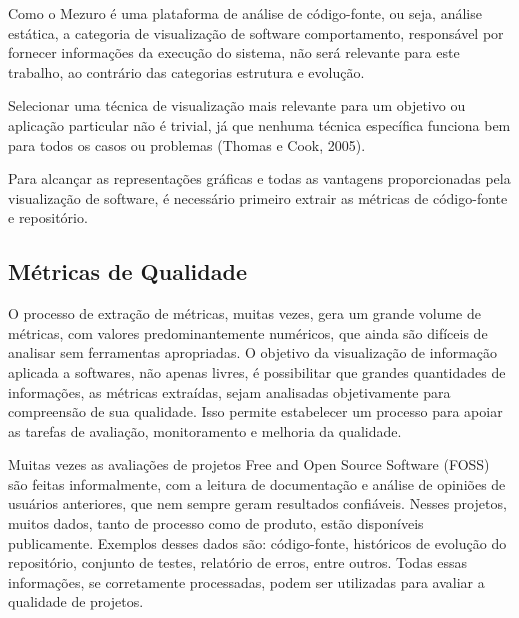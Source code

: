 Como o Mezuro é uma plataforma de análise de código-fonte, ou seja, análise estática, a categoria de visualização de software comportamento, responsável por fornecer informações da execução do sistema, não será relevante para este trabalho, ao contrário das categorias estrutura e evolução.

Selecionar uma técnica de visualização mais relevante para um objetivo ou aplicação particular não é trivial, já que nenhuma técnica específica funciona bem para todos os casos ou problemas (Thomas e Cook, 2005).


Para alcançar as representações gráficas e todas as vantagens proporcionadas pela visualização de software, é necessário primeiro extrair as métricas de código-fonte e repositório.

\subsection{Métricas de Qualidade}

O processo de extração de métricas, muitas vezes, gera um grande volume de métricas, com valores predominantemente numéricos, que ainda são difíceis de analisar sem ferramentas apropriadas. O objetivo da visualização de informação aplicada a softwares, não apenas livres, é possibilitar que grandes quantidades de informações, as métricas extraídas, sejam analisadas objetivamente para compreensão de sua qualidade. Isso permite estabelecer um processo para apoiar as tarefas de avaliação, monitoramento e melhoria da qualidade.

Muitas vezes as avaliações de projetos Free and Open Source Software (FOSS) são feitas informalmente, com a leitura de documentação e análise de opiniões de usuários anteriores, que nem sempre geram resultados confiáveis. Nesses projetos, muitos dados, tanto de processo como de produto, estão disponíveis publicamente. Exemplos desses dados são: código-fonte, históricos de evolução do repositório, conjunto de testes, relatório de erros, entre outros. Todas essas informações, se corretamente processadas, podem ser utilizadas para avaliar a qualidade de projetos. 


